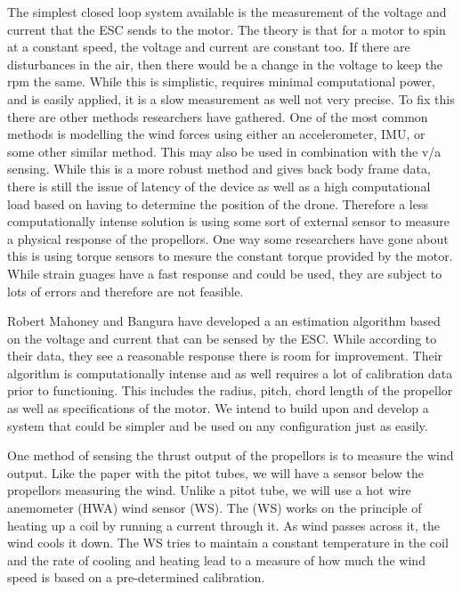 \documentclass{article}
\begin{document}
The simplest closed loop system available is the measurement of the voltage and current that the ESC sends to the motor. The theory is that for a motor to spin at a constant speed, the voltage and current are constant too. If there are disturbances in the air, then there would be a change in the voltage to keep the rpm the same. While this is simplistic, requires minimal computational power, and is easily applied,  it is a slow measurement as well not very precise. To fix this there are other methods researchers have gathered. One of the most common methods is modelling the wind forces using either an accelerometer, IMU, or some other similar method. This may also be used in combination with the v/a sensing. While this is a more robust method and gives back body frame data, there is still the issue of latency of the device as well as a high computational load based on having to determine the position of the drone. Therefore a less computationally intense solution is using some sort of external sensor to measure a physical response of the propellors. One way some researchers have gone about this is using torque sensors to mesure the constant torque provided by the motor. While strain guages have a fast response and could be used, they are subject to lots of errors and therefore are not feasible. 

Robert Mahoney and Bangura have developed a an estimation algorithm based on the voltage and current that can be sensed by the ESC. While according to their data, they see a reasonable response there is room for improvement. Their algorithm is computationally intense and as well requires a lot of calibration data prior to functioning. This includes the radius, pitch, chord length of the propellor as well as specifications of the motor. We intend to build upon and develop a system that could be simpler and be used on any configuration just as easily. 

One method of sensing the thrust output of the propellors is to measure the wind output. Like the paper with the pitot tubes, we will have a sensor below the propellors measuring the wind. Unlike a pitot tube, we will use a hot wire anemometer (HWA) wind sensor (WS). The (WS) works on the principle of heating up a coil by running a current through it. As wind passes across it, the wind cools it down. The WS tries to maintain a constant temperature in the coil and the rate of cooling and heating lead to a measure of how much the wind speed is based on a pre-determined calibration. 
\end{document}
